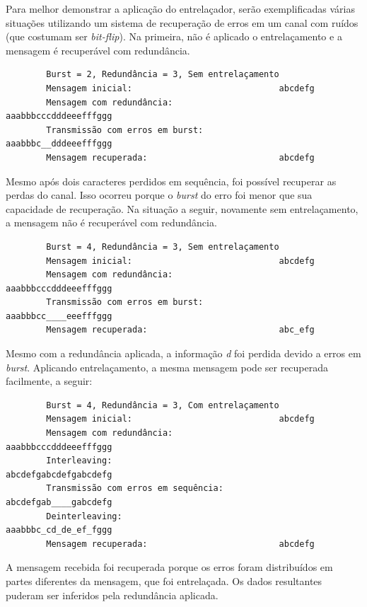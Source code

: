 	Para melhor demonstrar a aplicação do entrelaçador, serão exemplificadas várias situações utilizando um sistema de recuperação de erros em um canal com ruídos (que costumam ser \textit{bit-flip}). Na primeira, não é aplicado o entrelaçamento e a mensagem é recuperável com redundância.

	\begin{verbatim}
	    Burst = 2, Redundância = 3, Sem entrelaçamento
	    Mensagem inicial:                             abcdefg
	    Mensagem com redundância:                     aaabbbcccdddeeefffggg
	    Transmissão com erros em burst:               aaabbbc__dddeeefffggg
	    Mensagem recuperada:                          abcdefg
	\end{verbatim}

	Mesmo após dois caracteres perdidos em sequência, foi possível recuperar as perdas do canal. Isso ocorreu porque o \textit{burst} do erro foi menor que sua capacidade de recuperação. Na situação a seguir, novamente sem entrelaçamento, a mensagem não é recuperável com redundância.

	\begin{verbatim}
	    Burst = 4, Redundância = 3, Sem entrelaçamento
	    Mensagem inicial:                             abcdefg
	    Mensagem com redundância:                     aaabbbcccdddeeefffggg
	    Transmissão com erros em burst:               aaabbbcc____eeefffggg
	    Mensagem recuperada:                          abc_efg
	\end{verbatim}

	Mesmo com a redundância aplicada, a informação \textit{d} foi perdida devido a erros em \textit{burst}. Aplicando entrelaçamento, a mesma mensagem pode ser recuperada facilmente, a seguir:

	\begin{verbatim}
	    Burst = 4, Redundância = 3, Com entrelaçamento
	    Mensagem inicial:                             abcdefg
	    Mensagem com redundância:                     aaabbbcccdddeeefffggg
	    Interleaving:                                 abcdefgabcdefgabcdefg
	    Transmissão com erros em sequência:           abcdefgab____gabcdefg
	    Deinterleaving:                               aaabbbc_cd_de_ef_fggg
	    Mensagem recuperada:                          abcdefg
	\end{verbatim}

	A mensagem recebida foi recuperada porque os erros foram distribuídos em partes diferentes da mensagem, que foi entrelaçada. Os dados resultantes puderam ser inferidos pela redundância aplicada.


